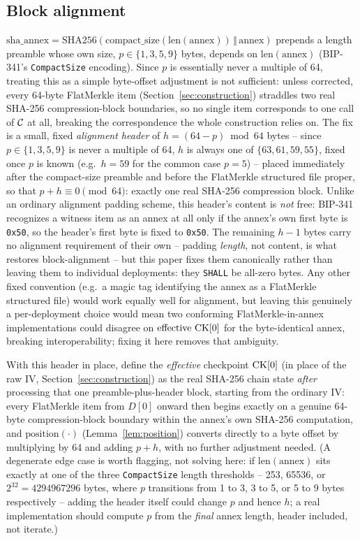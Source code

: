 \subsection{Block alignment}
\label{sec:annex-alignment}

$\mathrm{sha\_annex} = \mathrm{SHA256}(\mathrm{compact\_size}(\mathrm{len}(\mathrm{annex})) \,\Vert\, \mathrm{annex})$
prepends a length preamble whose own size, $p \in \{1,3,5,9\}$ bytes,
depends on $\mathrm{len}(\mathrm{annex})$ (BIP-341's \texttt{CompactSize}
encoding). Since $p$ is essentially never a multiple of 64, treating this
as a simple byte-offset adjustment is not sufficient: unless corrected,
every 64-byte FlatMerkle item (Section~\ref{sec:construction}) straddles
two real SHA-256 compression-block boundaries, so no single item
corresponds to one
call of $\mathcal{C}$ at all, breaking the correspondence the whole construction
relies on. The fix is a small, fixed \emph{alignment header} of
$h = (64 - p) \bmod 64$ bytes -- since $p \in \{1,3,5,9\}$ is never a
multiple of 64, $h$ is always one of $\{63,61,59,55\}$, fixed once $p$ is
known (e.g.\ $h=59$ for the common case $p=5$) -- placed immediately after
the compact-size preamble and before the FlatMerkle structured file
proper, so that $p + h \equiv 0 \pmod{64}$: exactly one real SHA-256
compression block. Unlike an ordinary alignment padding scheme, this
header's content is \emph{not} free: BIP-341 recognizes a witness item as
an annex at all only if the annex's own first byte is \texttt{0x50}, so
the header's first byte is fixed to \texttt{0x50}. The remaining $h-1$
bytes carry no alignment requirement of their own -- padding \emph{length},
not content, is what restores block-alignment -- but this paper fixes them
canonically rather than leaving them to individual deployments: they
\texttt{SHALL} be all-zero bytes. Any other fixed convention (e.g.\ a magic
tag identifying the annex as a FlatMerkle structured file) would work
equally well for alignment, but leaving this genuinely a per-deployment
choice would mean two conforming FlatMerkle-in-annex implementations could
disagree on $\mathrm{effective}~\mathrm{CK}[0]$ for the byte-identical annex,
breaking interoperability; fixing it here removes that ambiguity.

With this header in place, define the \emph{effective} checkpoint
$\mathrm{CK}[0]$ (in place of the raw $\mathrm{IV}$, Section~\ref{sec:construction})
as the real SHA-256 chain state \emph{after} processing that one
preamble-plus-header block, starting from the ordinary $\mathrm{IV}$: every
FlatMerkle item from $D[0]$ onward then begins exactly on a genuine
64-byte compression-block boundary within the annex's own SHA-256
computation, and $\mathrm{position}(\cdot)$ (Lemma~\ref{lem:position})
converts directly to a byte offset by multiplying by 64 and adding
$p + h$, with no further adjustment needed. (A degenerate edge case is
worth flagging, not solving here: if $\mathrm{len}(\mathrm{annex})$ sits
exactly at one of the three \texttt{CompactSize} length thresholds -- 253,
65536, or $2^{32} = 4294967296$ bytes, where $p$ transitions from 1 to 3,
3 to 5, or 5 to 9 bytes respectively -- adding the header itself could
change $p$ and hence $h$; a real implementation should compute $p$ from
the \emph{final} annex length, header included, not iterate.)


